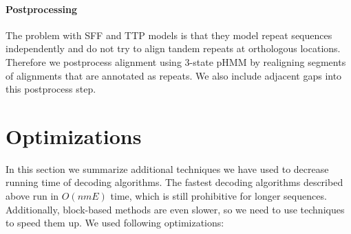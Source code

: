 \paragraph{Postprocessing}
The problem with SFF and TTP models is that they model repeat sequences
independently and do not try to align tandem repeats at orthologous locations.
Therefore we postprocess alignment using 3-state pHMM by realigning segments of
alignments that are annotated as repeats. We also include adjacent gaps into
this postprocess step.

\section{Optimizations}

In this section we summarize additional techniques we have used to decrease
running time of decoding algorithms. The fastest decoding algorithms described
above run in $O(nmE)$ time, which is still prohibitive for longer sequences.
Additionally, block-based methods are even slower, so we need to use techniques
to speed them up. We used following optimizations:
